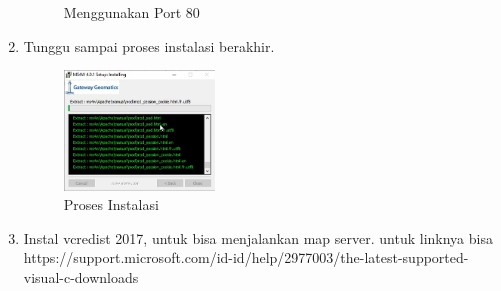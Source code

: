 \begin{enumerate}
\begin{figure}[H]
		\centering
		\caption{Menggunakan Port 80}
    \end{figure}
    \item Tunggu sampai proses instalasi berakhir.
    \begin{figure}[H]
		\includegraphics[width=4cm]{figures/tugas4/1174053/8.png}
		\centering
		\caption{Proses Instalasi}
    \end{figure}
    \item Instal vcredist 2017, untuk bisa menjalankan map server. untuk linknya bisa https://support.microsoft.com/id-id/help/2977003/the-latest-supported-visual-c-downloads
\end{enumerate}
